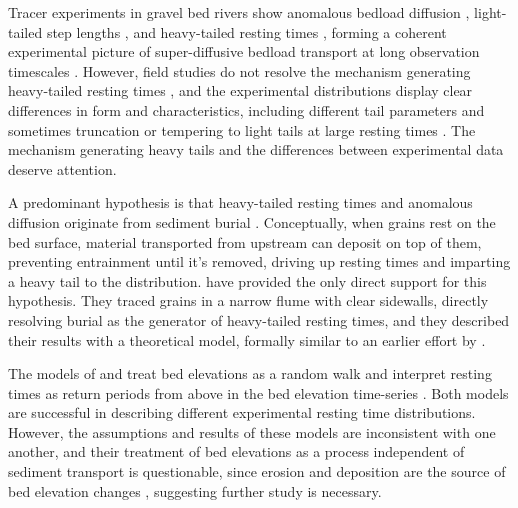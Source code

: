 \documentclass[draft]{agujournal2018}
\begin{document}
Tracer experiments in gravel bed rivers show anomalous bedload diffusion \citep{Phillips2013, Bradley2017}, light-tailed step lengths \citep{Bradley2012, Hassan2013}, and heavy-tailed resting times \citep{Voepel2013, Olinde2015, Pretzlav2016, Bradley2017}, forming a coherent experimental picture of super-diffusive bedload transport at long observation timescales \citep[e.g.][]{Nikora2002, Martin2012}.
However, field studies do not resolve the mechanism generating heavy-tailed resting times \citep[e.g.][]{Bradley2017}, and the experimental distributions display clear differences in form and characteristics, including different tail parameters \citep[e.g.][]{Olinde2015} and sometimes truncation \citep[e.g.][]{Bradley2017} or tempering to light tails at large resting times \citep[e.g.][]{Voepel2013}.
The mechanism generating heavy tails and the differences between experimental data deserve attention.

A predominant hypothesis is that heavy-tailed resting times and anomalous diffusion originate from sediment burial \citep{Voepel2013,Martin2014,Wu2019}.
Conceptually, when grains rest on the bed surface, material transported from upstream can deposit on top of them, preventing entrainment until it's removed, driving up resting times and imparting a heavy tail to the distribution.
\citet{Martin2014} have provided the only direct support for this hypothesis.
They traced grains in a narrow flume with clear sidewalls, directly resolving burial as the generator of heavy-tailed resting times, and they described their results with a theoretical model, formally similar to an earlier effort by \citet{Voepel2013}.

The models of \citet{Voepel2013} and \citet{Martin2014} treat bed elevations as a random walk and interpret resting times as return periods from above in the bed elevation time-series \citep[e.g.][]{Redner2007}.
Both models are successful in describing different experimental resting time distributions.
However, the assumptions and results of these models are inconsistent with one another, and their treatment of bed elevations as a process independent of sediment transport is questionable, since erosion and deposition are the source of bed elevation changes \citep[e.g.][]{Wong2007}, suggesting further study is necessary.
\end{document}
